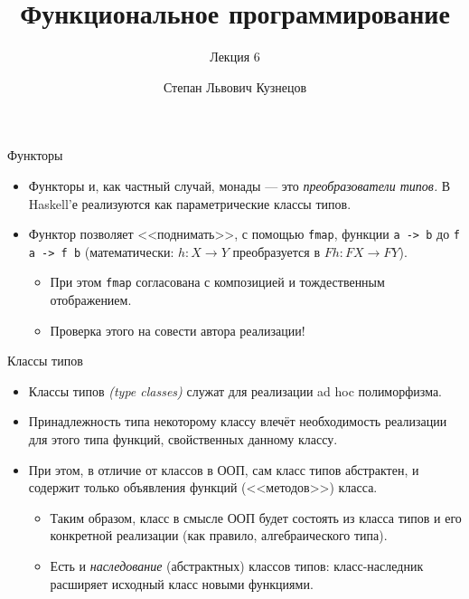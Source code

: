 \documentclass[xcolor=dvipsnames]{beamer}
\begin{document}
\title{Функциональное программирование}
\subtitle{Лекция 6}
\date{}
\author{Степан Львович Кузнецов}


\maketitle

\begin{frame}{Функторы}
 
 \begin{itemize}[<+->]
  \item Функторы и, как частный случай, монады --- это {\em преобразователи типов.} В Haskell'е реализуются как параметрические классы типов.
  \item Функтор позволяет <<поднимать>>, с помощью {\tt fmap}, функции {\tt a -> b} до {\tt f a -> f b} (математически: $h \colon X \to Y$ преобразуется в $F h \colon FX \to FY$).
  \begin{itemize}
  \item При этом {\tt fmap} согласована с композицией и тождественным отображением.
  \item Проверка этого на совести автора реализации!
  \end{itemize}
 \end{itemize}

\end{frame}

\iffalse 

\begin{frame}{Классы типов}
 
 \begin{itemize}[<+->]
  \item Классы типов {\em (type classes)} служат для реализации ad hoc полиморфизма.
  \item Принадлежность типа некоторому классу влечёт необходимость реализации для этого типа функций, свойственных данному классу.
  \item При этом, в отличие от классов в ООП, сам класс типов абстрактен, и содержит только объявления функций (<<методов>>) класса.
  \begin{itemize}
    \item Таким образом, класс в смысле ООП будет состоять из класса типов и его конкретной реализации (как правило, алгебраического типа).
    \item Есть и {\em наследование} (абстрактных) классов типов: класс-наследник расширяет исходный класс новыми функциями.
  \end{itemize}
 \end{itemize}

\end{frame}
\end{document}
